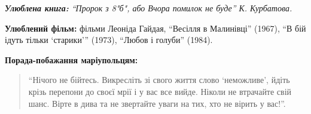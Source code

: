 
\begingroup
\em\textbf{Улюблена книга:} \enquote{Пророк з 8"б", або Вчора помилок не буде} К. Курбатова.

\textbf{Улюблений фільм:} фільми Леоніда Гайдая, \enquote{Весілля в Малинівці} (1967), \enquote{В бій
ідуть тільки \enquote{старики}} (1973), \enquote{Любов і голуби} (1984).

\textbf{Порада-побажання маріупольцям:} 

\begin{quote}
\enquote{Нічого не бійтесь. Викресліть зі свого життя
слово \enquote{неможливе}, йдіть крізь перепони до своєї мрії і у вас все вийде. Ніколи
не втрачайте свій шанс. Вірте в дива та не звертайте уваги на тих, хто не
вірить у вас!}.
\end{quote}
\endgroup
